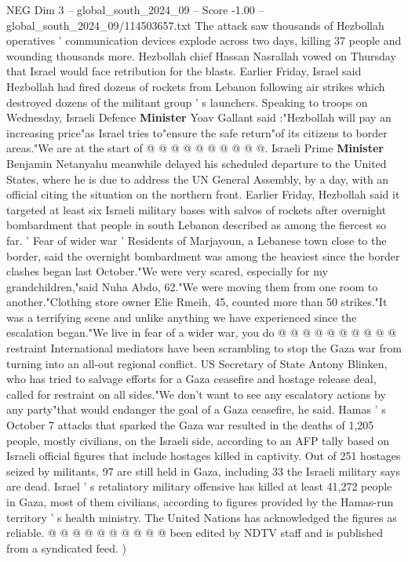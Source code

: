 \begin{textsample}{NEG Dim 3 – global\_south\_2024\_09 – Score -1.00 – global\_south\_2024\_09/114503657.txt}
The attack saw thousands of Hezbollah operatives ' communication devices explode across two days, killing 37 people and wounding thousands more.
Hezbollah chief Hassan Nasrallah vowed on Thursday that Israel would face retribution for the blasts.
Earlier Friday, Israel said Hezbollah had fired dozens of rockets from Lebanon following air strikes which destroyed dozens of the militant group ' s launchers.
Speaking to troops on Wednesday, Israeli Defence \textbf{Minister} Yoav Gallant said :"Hezbollah will pay an increasing price"as Israel tries to"ensure the safe return"of its citizens to border areas."We are at the start of @ @ @ @ @ @ @ @ @ @.
Israeli Prime \textbf{Minister} Benjamin Netanyahu meanwhile delayed his scheduled departure to the United States, where he is due to address the UN General Assembly, by a day, with an official citing the situation on the northern front.
Earlier Friday, Hezbollah said it targeted at least six Israeli military bases with salvos of rockets after overnight bombardment that people in south Lebanon described as among the fiercest so far. ' Fear of wider war ' Residents of Marjayoun, a Lebanese town close to the border, said the overnight bombardment was among the heaviest since the border clashes began last October."We were very scared, especially for my grandchildren,"said Nuha Abdo, 62."We were moving them from one room to another."Clothing store owner Elie Rmeih, 45, counted more than 50 strikes."It was a terrifying scene and unlike anything we have experienced since the escalation began."We live in fear of a wider war, you do @ @ @ @ @ @ @ @ @ @ restraint International mediators have been scrambling to stop the Gaza war from turning into an all-out regional conflict.
US Secretary of State Antony Blinken, who has tried to salvage efforts for a Gaza ceasefire and hostage release deal, called for restraint on all sides."We don't want to see any escalatory actions by any party"that would endanger the goal of a Gaza ceasefire, he said.
Hamas ' s October 7 attacks that sparked the Gaza war resulted in the deaths of 1,205 people, mostly civilians, on the Israeli side, according to an AFP tally based on Israeli official figures that include hostages killed in captivity.
Out of 251 hostages seized by militants, 97 are still held in Gaza, including 33 the Israeli military says are dead.
Israel ' s retaliatory military offensive has killed at least 41,272 people in Gaza, most of them civilians, according to figures provided by the Hamas-run territory ' s health ministry.
The United Nations has acknowledged the figures as reliable. @ @ @ @ @ @ @ @ @ @ been edited by NDTV staff and is published from a syndicated feed. )

\end{textsample}
